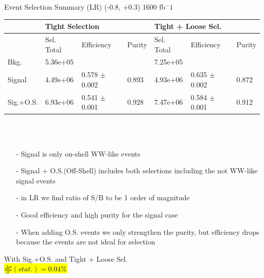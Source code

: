 \documentclass[10pt]{beamer}
\begin{document}
\begin{frame}{Event Selection Summary (LR)}
 \tiny
 (-0.8, +0.3) 1600 fb${^-1}$\\
  \begin{tabular}{ |p{}|p{}p{}|p{}|p{}p{}p{}|} 
 \hline 
   &  \multicolumn{3}{|l|}{Tight Selection} &  \multicolumn{3}{|l|}{ Tight + Loose Sel.}  \\  \hline  
 & Sel. Total & Efficiency & Purity & Sel. Total & Efficiency & Purity \\ 
 \hline  
 Bkg. & 5.36e+05 & & & 7.25e+05 & &  \\ 
 Signal & 4.49e+06 & 0.578 $\pm$ 0.002 & 0.893  & 4.93e+06 & 0.635 $\pm$ 0.002 & 0.872 \\ 
 \rowcolor{orange}
 Sig.+O.S. & 6.93e+06 & 0.541 $\pm$ 0.001 & 0.928 & 7.47e+06 & 0.584 $\pm$ 0.001 & 0.912 \\ 
\hline 
\end{tabular} 
 \\
\normalsize
\quad \quad \\
\scriptsize
\begin{itemize}
\item[-] Signal is only on-shell WW-like events
\item[-] Signal + O.S.(Off-Shell) includes both selections including the not WW-like signal events
\item[-] in LR we find ratio of S/B to be 1 order of magnitude
\item[-] Good efficiency and high purity for the signal case
\item[-] When adding O.S. events we only strengthen the purity, but efficiency drops because the events are not ideal for selection
\end{itemize}
With Sig.+O.S. and Tight + Loose Sel.\\
\colorbox{yellow}{ $ \frac{\Delta\sigma}{\sigma} (stat.) = 0.04 \%$}
\end{frame}
\end{document}
